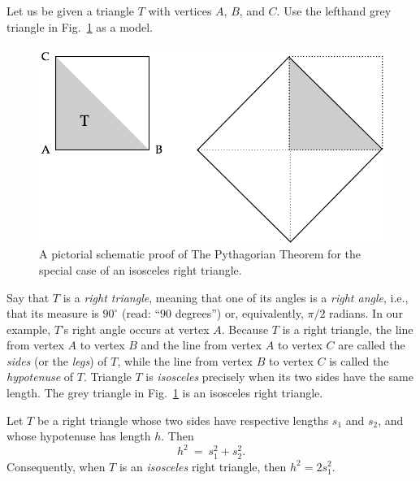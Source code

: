 Let us be given a triangle $T$ with vertices $A$, $B$, and $C$.
 Use the lefthand grey triangle in
Fig.~\ref{fig:unitsquare} as a model.
\begin{figure}[htb]
\begin{center}
       \includegraphics[scale=0.3]{FiguresArithmetic/UnitSquareSQRT2}
\caption{A pictorial schematic proof of The Pythagorian Theorem for
  the special case of an isosceles right triangle.
\label{fig:unitsquare}}
\end{center}
\end{figure}
%
%
Say that $T$ is a {\it right triangle}, 
meaning that one of its angles is a {\em right angle},
 i.e., that its measure is $90^\circ$
 
(read: ``$90$ degrees'') or, equivalently, $\pi/2$ radians.  In our
example, $T$'s right angle occurs at vertex $A$.  Because $T$ is a
right triangle, the line from vertex $A$ to vertex $B$ and the line
from vertex $A$ to vertex $C$ are called the {\em sides}
 (or the {\it legs}) of $T$, while
the line from vertex $B$ to vertex $C$ is called the {\em hypotenuse}
 of $T$.  Triangle $T$ is
{\em isosceles}  precisely when its
two sides have the same length.  The grey triangle in
Fig.~\ref{fig:unitsquare} is an isosceles right triangle.

\begin{theorem}
\label{thm:Pythagorean-thm}
Let $T$ be a right triangle whose two sides have respective lengths
$s_1$ and $s_2$, and whose hypotenuse has length $h$.  Then
\[ h^2 \ = \ s_1^2 + s_2^2. \]
Consequently, when $T$ is an {\em isosceles} right triangle, then $h^2
= 2 s_1^2$.
\end{theorem}

